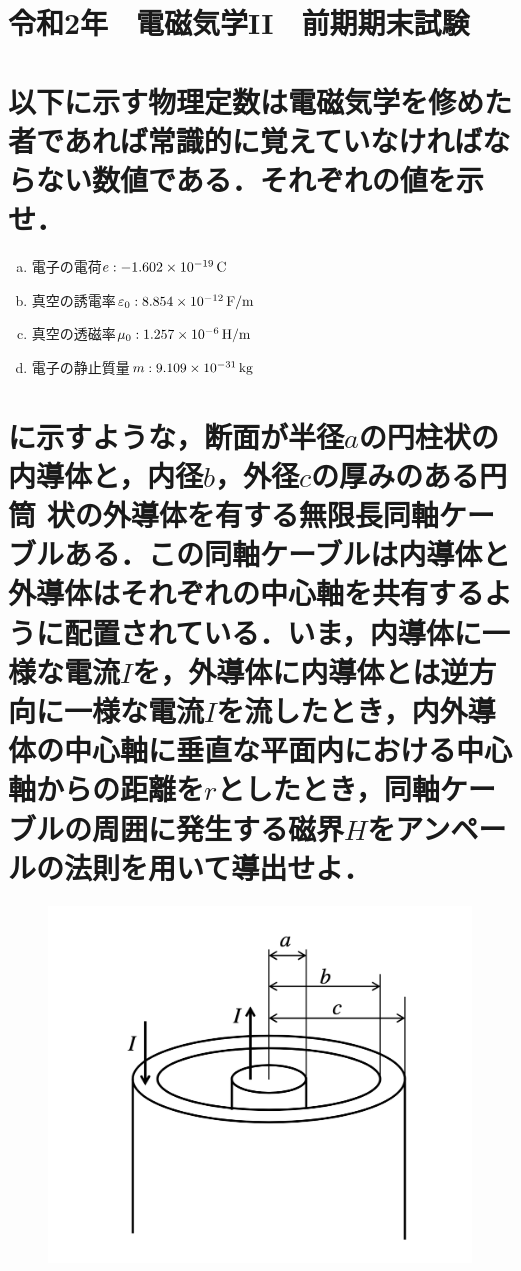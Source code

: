 \documentclass[dvipdfmx]{ujarticle}
\begin{document}
\clearpage
\setcounter{section}{0}
\section*{令和2年　電磁気学II　前期期末試験}
\section{以下に示す物理定数は電磁気学を修めた者であれば常識的に覚えていなければならない数値である．それぞれの値を示せ．}
\begin{enumerate}[(a)]
	\item 電子の電荷$e:-1.602 \times 10^{-19}\,\rm{C}$
	\item 真空の誘電率$\varepsilon_{0}:8.854 \times 10^{-12}\,\rm{F/m}$
	\item 真空の透磁率$\mu_{0}:1.257 \times 10^{-6}\,\rm{H/m}$
	\item 電子の静止質量$m:9.109\times 10^{-31}\,\rm{kg}$
\end{enumerate}

\section{に示すような，断面が半径$a$の円柱状の内導体と，内径$b$，外径$c$の厚みのある円筒 状の外導体を有する無限長同軸ケーブルある．この同軸ケーブルは内導体と外導体はそれぞれの中心軸を共有するように配置されている．いま，内導体に一様な電流$I$を，外導体に内導体とは逆方向に一様な電流$I$を流したとき，内外導体の中心軸に垂直な平面内における中心軸からの距離を$r$としたとき，同軸ケーブルの周囲に発生する磁界$H$をアンペールの法則を用いて導出せよ．}

\begin{figure}[h]
	\centering
	\includegraphics[scale=0.35]{./fig/R03_fig1.png}
	\caption{}
	\label{fig:1}
\end{figure}
\end{document}
